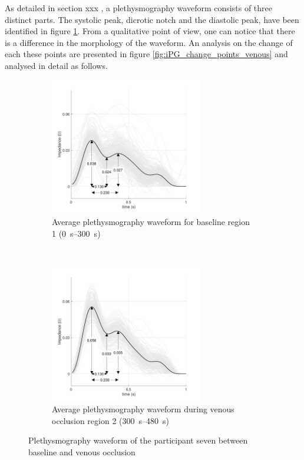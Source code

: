 As detailed in section xxx , a plethysmography waveform consists of three distinct parts. The systolic peak, dicrotic notch and the diastolic peak, have been identified in figure \ref{fig:iPG_venous_baseline}. From a qualitative point of view, one can notice that there is a difference in the morphology of the waveform. An analysis on the change of each these points are presented in figure \ref{fig:iPG_change_points_venous} and analysed in detail as follows.

\begin{figure}[!htbp]
	\centering
	\begin{subfigure}[t]{0.48\textwidth}
		\centering
		\includegraphics[height=6cm]{figure6a}
		\caption{Average plethysmography waveform for baseline region 1 (\SIrange{0}{300}{\second})}
		\label{fig:iPG_venous_baseline}
	\end{subfigure}%
	~ 
	\begin{subfigure}[t]{0.48\textwidth}
		\centering
		\includegraphics[height=6cm]{figure6b}
		\caption{Average plethysmography waveform during venous occlusion region 2 (\SIrange{300}{480}{\second})}
		\label{fig:iPG_venous_occlusion}
	\end{subfigure}
	\caption{Plethysmography waveform of the participant seven between baseline and venous occlusion}
	\label{fig:iPG_venous}
\end{figure}

